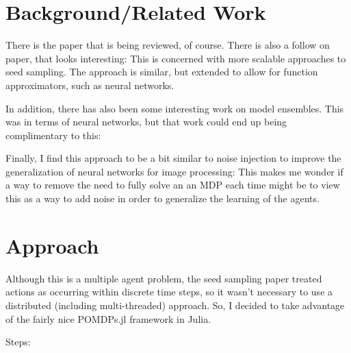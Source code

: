 \documentclass{article}
\begin{document}
\section{Background/Related Work}
There is the paper that is being reviewed, of course. There is also a follow on paper, that looks interesting: \cite{SCALSS} This is concerned with more scalable approaches to seed sampling. The approach is similar, but extended to allow for function approximators, such as neural networks.

In addition, there has also been some interesting work on model ensembles. This was in terms of neural networks, but that work could end up being complimentary to this: \cite{1503.02531}

Finally, I find this approach to be a bit similar to noise injection to improve the generalization of neural networks for image processing: \cite{zur2009noise} This makes me wonder if a way to remove  the need to fully solve an an MDP each time might be to view this as a way to add noise in order to generalize the learning of the agents.

\section{Approach}
Although this is a multiple agent problem, the seed sampling paper treated actions as occurring within discrete time steps, so it wasn't necessary to use a distributed (including multi-threaded) approach. So, I decided to take advantage of the fairly nice POMDPs.jl framework in Julia. 

Steps:
\end{document}
